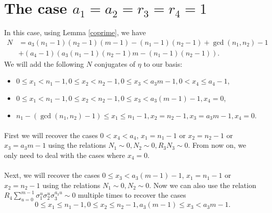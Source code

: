 \documentclass[12pt,a4paper]{article}
\theoremstyle{definition}
\begin{document}
\section{The case $a_1=a_2=r_3=r_4=1$}
In this case, using Lemma \ref{coprime}, we have
\begin{equation*}
\begin{split}
N&=a_3\left(n_1-1\right)\left(n_2-1\right)\left(m-1\right)-\left(n_1-1\right)\left(n_2-1\right)+\gcd\left(n_1,n_2\right)-1\\
&+(a_4-1)\left(a_3\left(n_1-1\right)\left(n_2-1\right)m-\left(n_1-1\right)\left(n_2-1\right)\right).
\end{split}
\end{equation*}
We will add the following $N$ conjugates of $\eta$ to our basis:
\begin{itemize}
\item $0\leq x_1<n_1-1, 0\leq x_2<n_2-1, 0\leq x_3<a_3m-1, 0<x_4\leq a_4-1$,
\item $0\leq x_1<n_1-1, 0\leq x_2<n_2-1, 0\leq x_3<a_3(m-1)-1, x_4=0$,
\item $n_1-(\gcd\left(n_1,n_2\right)-1)\leq x_1\leq n_1-1, x_2=n_2-1, x_3=a_3m-1, x_4=0$.
\end{itemize}

\paragraph*{}
First we will recover the cases $0<x_4<a_4$, $x_1=n_1-1$ or $x_2=n_2-1$ or $x_3=a_3m-1$ using the relations $N_1\sim 0, N_2\sim 0, R_3N_3\sim 0$. From now on, we only need to deal with the cases where $x_4=0$.
\paragraph*{}
Next, we will recover the cases $0\leq x_3<a_3(m-1)-1$, $x_1=n_1-1$ or $x_2=n_2-1$ using the relations $N_1\sim 0, N_2\sim 0$. Now we can also use the relation $R_4\sum_{u=0}^{m-1}\sigma_1^{u}\sigma_2^{u}\sigma_3^{a_3u}\sim 0$ multiple times to recover the cases $$0\leq x_1\leq n_1-1, 0\leq x_2\leq n_2-1, a_3(m-1)\leq x_3<a_3m-1.$$
\end{document}
